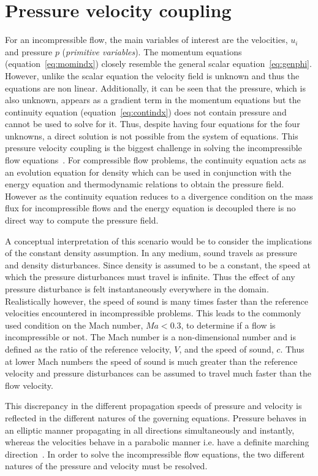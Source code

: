 \section{Pressure velocity coupling}
For an incompressible flow, the main variables of interest are the velocities, $u_i$ and pressure $p$ (\textit{primitive variables}). The momentum equations (equation~\ref{eq:momindx}) closely resemble the general scalar equation~\ref{eq:genphi}. However, unlike the scalar equation the velocity field is unknown and thus the equations are non linear. Additionally, it can be seen that the pressure, which is also unknown, appears as a gradient term in the momentum equations but the continuity equation (equation~\ref{eq:contindx}) does not contain pressure and cannot be used to solve for it. Thus, despite having four equations for the four unknowns, a direct solution is not possible from the system of equations. This pressure velocity coupling is the biggest challenge in solving the incompressible flow equations~\cite{Kwak2003,KWAK2005283, Ferziger2002, Moukalled, Shyy1994}. For compressible flow problems, the continuity equation acts as an evolution equation for density which can be used in conjunction with the energy equation and thermodynamic relations to obtain the pressure field. However as the continuity equation reduces to a divergence condition on the mass flux for incompressible flows and the energy equation is decoupled there is no direct way to compute the pressure field. 

A conceptual interpretation of this scenario would be to consider the implications of the constant density assumption. In any medium, sound travels as pressure and density disturbances. Since density is assumed to be a constant, the speed at which the pressure disturbances must travel is infinite. Thus the effect of any pressure disturbance is felt instantaneously everywhere in the domain. Realistically however, the speed of sound is many times faster than the reference velocities encountered in incompressible problems. This leads to the commonly used condition on the Mach number, $Ma < 0.3$, to determine if a flow is incompressible or not. The Mach number is a non-dimensional number and is defined as the ratio of the reference velocity, $V$, and the speed of sound, $c$. Thus at lower Mach numbers the speed of sound is much greater than the reference velocity and pressure disturbances can be assumed to travel much faster than the flow velocity.

This discrepancy in the different propagation speeds of pressure and velocity is reflected in the different natures of the governing equations. Pressure behaves in an elliptic manner propagating in all directions simultaneously and instantly, whereas the velocities behave in a parabolic manner i.e. have a definite marching direction~\cite{Ferziger2002}. In order to solve the incompressible flow equations, the two different natures of the pressure and velocity must be resolved.

